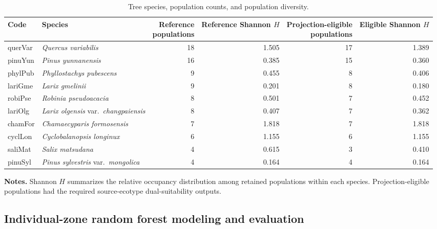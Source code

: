 \documentclass[11pt]{article}
\begin{document}
\begin{table}[htbp]
  \centering
  \caption{Tree species, population counts, and population diversity.}
  \label{tab:tree-pops}
  \scriptsize
  \setlength{\tabcolsep}{3.2pt}
  \renewcommand{\arraystretch}{1.08}
  \begin{tabularx}{\textwidth}{@{}l>{\raggedright\arraybackslash}Xrrrr@{}}
    \toprule
    Code & Species &
    \shortstack{Reference\\populations} &
    \shortstack{Reference\\Shannon $H$} &
    \shortstack{Projection-eligible\\populations} &
    \shortstack{Eligible\\Shannon $H$} \\
    \midrule
    querVar & \textit{Quercus variabilis} & 18 & 1.505 & 17 & 1.389 \\
    pinuYun & \textit{Pinus yunnanensis} & 16 & 0.385 & 15 & 0.360 \\
    phylPub & \textit{Phyllostachys pubescens} & 9 & 0.455 & 8 & 0.406 \\
    lariGme & \textit{Larix gmelinii} & 9 & 0.201 & 8 & 0.180 \\
    robiPse & \textit{Robinia pseudoacacia} & 8 & 0.501 & 7 & 0.452 \\
    lariOlg & \textit{Larix olgensis} var.~\textit{changpaiensis} & 8 & 0.407 & 7 & 0.362 \\
    chamFor & \textit{Chamaecyparis formosensis} & 7 & 1.818 & 7 & 1.818 \\
    cyclLon & \textit{Cyclobalanopsis longinux} & 6 & 1.155 & 6 & 1.155 \\
    saliMat & \textit{Salix matsudana} & 4 & 0.615 & 3 & 0.410 \\
    pinuSyl & \textit{Pinus sylvestris} var.~\textit{mongolica} & 4 & 0.164 & 4 & 0.164 \\
    \bottomrule
  \end{tabularx}
  \begin{minipage}{0.98\textwidth}
    \footnotesize
    \vspace{0.3em}
    \textbf{Notes.} Shannon $H$ summarizes the relative occupancy distribution among retained
    populations within each species. Projection-eligible populations had the
    required source-ecotype dual-suitability outputs.
  \end{minipage}
\end{table}

\subsection{Individual-zone random forest modeling and evaluation}
\end{document}
